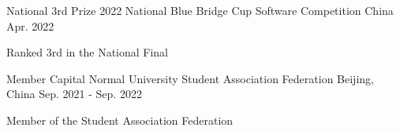 

\begin{cventries}

  \cventry
  {National 3rd Prize} %
  {2022 National Blue Bridge Cup Software Competition} %
  {China} %
  {Apr. 2022} %
  {
    \begin{cvitems}
      \item {Ranked 3rd in the National Final}
    \end{cvitems}
  }


  \cventry
  {Member} %
  {Capital Normal University Student Association Federation} %
  {Beijing, China} %
  {Sep. 2021 - Sep. 2022} %
  {
    \begin{cvitems}
      \item {Member of the Student Association Federation}
    \end{cvitems}
  }
\end{cventries}
